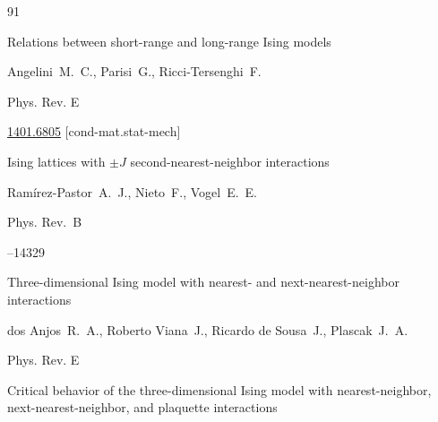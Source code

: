 \begin{thebibliography}{91}






\paper  Relations between short-range and long-range Ising models

\by Angelini~M.~C., Parisi~G., Ricci-Tersenghi~F.

\jour Phys. Rev. E






\arxiv \href{http://arxiv.org/abs/1401.6805}{1401.6805} [cond-mat.stat-mech]




\paper  Ising lattices with $\pm J$ second-nearest-neighbor interactions

\by Ram\'irez-Pastor~A.~J.,  Nieto~F., Vogel~E.~E. 

\jour Phys. Rev.~B




--14329





\paper  Three-dimensional Ising model with nearest- and next-nearest-neighbor interactions

\by  dos Anjos~R.~A., Roberto Viana~J., Ricardo de Sousa~J., Plascak~J.~A. 

\jour Phys. Rev. E











\paper  Critical behavior of the three-dimensional Ising model with nearest-neighbor, next-nearest-neighbor, and plaquette interactions


\end{thebibliography}
